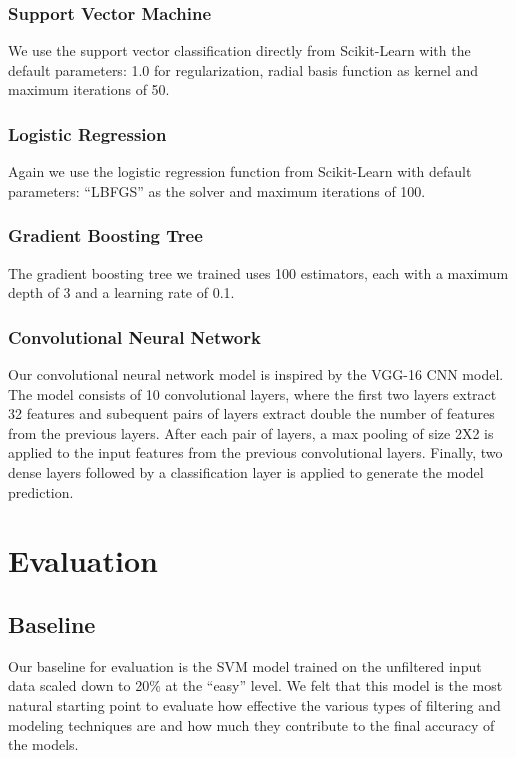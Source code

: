 \documentclass[
	a4paper, %
	10pt, %
	unnumberedsections, %
	twoside, %
]{t0004}
\begin{document}
\subsubsection{Support Vector Machine} We use the support vector classification directly from Scikit-Learn with the default parameters: 1.0 for regularization, radial basis function as kernel and maximum iterations of 50. 

\subsubsection{Logistic Regression} Again we use the logistic regression function from Scikit-Learn with default parameters: ``LBFGS'' as the solver and maximum iterations of 100.

\subsubsection{Gradient Boosting Tree} The gradient boosting tree we trained uses 100 estimators, each with a maximum depth of 3 and a learning rate of 0.1.

\subsubsection{Convolutional Neural Network}  Our convolutional neural network model is inspired by the VGG-16 CNN model. The model consists of 10 convolutional layers, where the first two layers extract 32 features and subequent pairs of layers extract double the number of features from the previous layers. After each pair of layers, a max pooling of size 2X2 is applied to the input features from the previous convolutional layers. Finally, two dense layers followed by a classification layer is applied to generate the model prediction. 

\section{Evaluation}

\subsection{Baseline}

Our baseline for evaluation is the SVM model trained on the unfiltered input data scaled down to 20\% at the ``easy'' level. We felt that this model is the most natural starting point to evaluate how effective the various types of filtering and modeling techniques are and how much they contribute to the final accuracy of the models.
\end{document}
